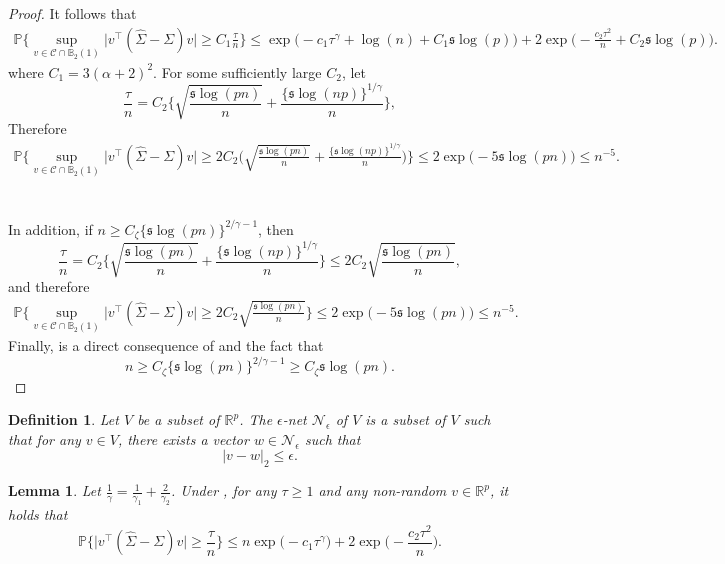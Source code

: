 \documentclass[11pt]{article}
\newcommand{\s}{ { \mathfrak{s}  } }
\newcommand{\p}{\mathbb P}
\theoremstyle{plain}
\newtheorem{lemma}[theorem]{Lemma}
\newtheorem{definition}{Definition}
\theoremstyle{definition}
\begin{document}
\begin{proof}
  It follows that   
\begin{align*}
 \p\bigg\{  \sup_{ v\in \mathcal C \cap \mathbb B_2(1) } \bigg| v^\top  (\widehat \Sigma -\Sigma )v\bigg|    \ge C _1   \frac{\tau}{n}\bigg\} 
\le   \exp\Big(-c_1  \tau ^{\gamma} +\log(n)+C _1\s\log(p) \Big) + 2 \exp\Big(-\frac{c_2 \tau ^2}{ n   }  +C_2 \s\log(p)  \Big) .
\end{align*}
where 
$C_1  = 3  (\alpha +2)^2.   $
For some sufficiently large $C_2$, let
$$ \frac{\tau}{n} =   C_2 \bigg\{  \sqrt {  \frac{\s \log(pn) }{n}  }  +   \frac{ \{ \s \log(np)\} ^{1/\gamma } }{n} \bigg \},  $$
Therefore
\begin{align*}
 \p\bigg\{  \sup_{ v\in \mathcal C \cap \mathbb B_2(1) } \bigg| v^\top  (\widehat \Sigma -\Sigma )v\bigg|    \ge 2 C_2 \bigg(  \sqrt {  \frac{\s \log(pn) }{n}  }  +   \frac{ \{ \s \log(np)\} ^{1/\gamma } }{n} \bigg )  \bigg\} 
\le 2 \exp \bigg ( -5 \s\log(pn)  \bigg) \le n^{-5}.
\end{align*} 
\\
\\
In addition, if $ n\ge C_{\zeta} \{ \s \log(pn)\}^{2/ \gamma  - 1}$, then
$$ \frac{\tau}{n} =   C_2 \bigg\{  \sqrt {  \frac{\s \log(pn) }{n}  }  +   \frac{ \{ \s \log(np)\} ^{1/\gamma } }{n} \bigg \}  \le 2 C_2   \sqrt {  \frac{\s \log(pn) }{n}  } ,  $$
and therefore
\begin{align}\label{eq:RES version 2 step 1}
 \p\bigg\{  \sup_{ v\in \mathcal C \cap \mathbb B_2(1) } \bigg| v^\top  (\widehat \Sigma -\Sigma )v\bigg|    \ge 2 C _2\sqrt { \frac{\s\log(pn)}{ n}}  \bigg\} 
\le 2 \exp \bigg ( -5 \s\log(pn)  \bigg) \le n^{-5}.
\end{align} 
Finally,  is a direct consequence of  and the fact that
 $$n\ge C_{\zeta} \{ \s \log(pn)\}^{2/ \gamma  - 1}   \ge  C_{\zeta} \s \log(pn) .$$ 
\end{proof} 




\begin{definition}
Let $V $ be a subset of $\mathbb R^p$. The  $\epsilon$-net  $\mathcal N_\epsilon $ of  $V $ is a subset of $V$ such that for any $v \in V$, there exists a vector $w\in \mathcal N_\epsilon $ such that 
$$  | v-w |_2 \le \epsilon. $$

\end{definition}

\begin{lemma} \label{lemma:RES step 1}
Let 
 $\frac{ 1}{\gamma}  = \frac{1}{\gamma_1}  +  \frac{ 2} { \gamma_2}$.
Under   ,
   for any $\tau\ge  1$  and any non-random $v\in \mathbb R ^p $, it holds that 
$$ \p\bigg\{   \big | v^\top (\widehat \Sigma - \Sigma ) v\big | \ge      \frac{\tau}{n}  \bigg\} 
\le   n  \exp\Big(-c_1  \tau ^{\gamma} \Big) + 2 \exp\Big(-\frac{c_2 \tau ^2}{ n   }\Big) .
$$ 
\end{lemma} 
 
\end{document}
